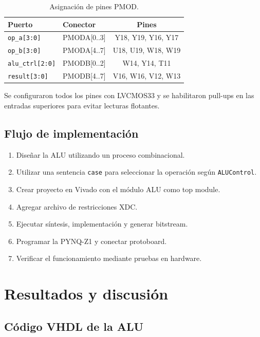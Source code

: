 \documentclass[12pt,letterpaper]{article}
\begin{document}
\begin{table}[H]
\centering
\caption{Asignación de pines PMOD.}
\label{tab:pines}
\begin{tabular}{llc}
\toprule
Puerto & Conector & Pines \\
\midrule
\texttt{op\_a[3:0]}    & PMODA[0..3] & Y18, Y19, Y16, Y17 \\
\texttt{op\_b[3:0]}    & PMODA[4..7] & U18, U19, W18, W19 \\
\texttt{alu\_ctrl[2:0]} & PMODB[0..2] & W14, Y14, T11 \\
\texttt{result[3:0]}   & PMODB[4..7] & V16, W16, V12, W13 \\
\bottomrule
\end{tabular}
\end{table}

Se configuraron todos los pines con LVCMOS33 y se habilitaron pull-ups en las entradas superiores para evitar lecturas flotantes.

\subsection{Flujo de implementación}
\begin{enumerate}
  \item Diseñar la ALU utilizando un proceso combinacional.
  \item Utilizar una sentencia \texttt{case} para seleccionar la operación según \texttt{ALUControl}.
  \item Crear proyecto en Vivado con el módulo ALU como top module.
  \item Agregar archivo de restricciones XDC.
  \item Ejecutar síntesis, implementación y generar bitstream.
  \item Programar la PYNQ-Z1 y conectar protoboard.
  \item Verificar el funcionamiento mediante pruebas en hardware.
\end{enumerate}

\onecolumn

\section{Resultados y discusión}

\subsection{Código VHDL de la ALU}
\end{document}
